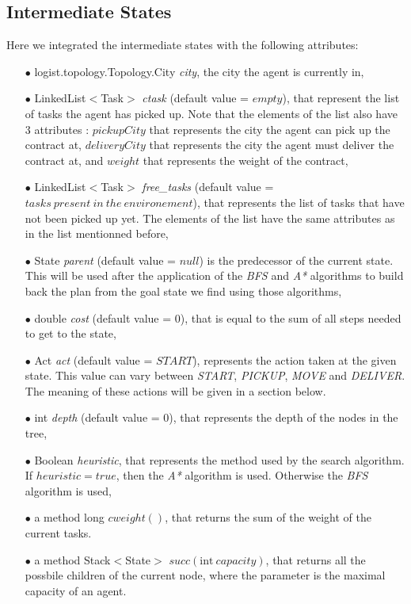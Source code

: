 \documentclass[11pt]{article}
\begin{document}
\subsection{Intermediate States}
Here we integrated the intermediate states with the following attributes:
\begin{itemize}
	\item[$\bullet$] logist.topology.Topology.City \emph{city}, the city the agent is currently in,
	\item[$\bullet$] LinkedList$<$Task$>$ \emph{ctask} (default value = $empty$), that represent the list of tasks the agent has picked up. Note that the elements of the list also have 3 attributes : $pickupCity$ that represents the city the agent can pick up the contract at, $deliveryCity$ that represents the city the agent must deliver the contract at, and $weight$ that represents the weight of the contract,
	\item[$\bullet$] LinkedList$<$Task$>$ \emph{free\_tasks} (default value = $tasks\ present\ in\ the\ environement$), that represents the list of tasks that have not been picked up yet. The elements of the list have the same attributes as in the list mentionned before,
	\item[$\bullet$] State \emph{parent} (default value = $null$) is the predecessor of the current state. This will be used after the application of the \emph{BFS} and \emph{A*} algorithms to build back the plan from the goal state we find using those algorithms,
	\item[$\bullet$] double \emph{cost} (default value = $0$), that is equal to the sum of all steps needed to get to the state, 
	\item[$\bullet$] Act \emph{act} (default value = $START$), represents the action taken at the given state. This value can vary between \emph{START}, \emph{PICKUP}, \emph{MOVE} and \emph{DELIVER}. The meaning of these actions will be given in a section below.
	\item[$\bullet$] int \emph{depth} (default value = $0$), that represents the depth of the nodes in the tree,
	\item[$\bullet$] Boolean \emph{heuristic}, that represents the method used by the search algorithm. If $heuristic=true$, then the \emph{A*} algorithm is used. Otherwise the \emph{BFS} algorithm is used,
	\item[$\bullet$] a method long $cweight()$, that returns the sum of the weight of the current tasks.
	\item[$\bullet$] a method Stack$<$State$>$ $succ(\mathrm{int}\ capacity) $, that returns all the possbile children of the current node, where the parameter is the maximal capacity of an agent.
\end{itemize}
\end{document}
